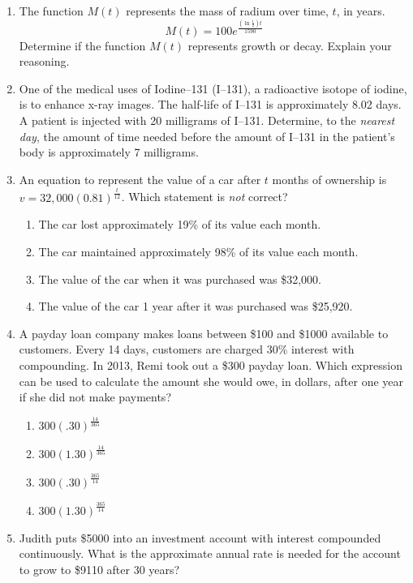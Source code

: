 \documentclass[12pt, oneside]{article}
\begin{document}
\begin{enumerate}
\item The function $M(t)$ represents the mass of radium over time, $t$, in years.
\[M(t)=100e^{\frac{\left(\ln{\frac{1}{2}}\right)t}{1590}}
\]
Determine if the function $M(t)$ represents growth or decay. Explain your reasoning. %

\item One of the medical uses of Iodine–131 (I–131), a radioactive isotope of iodine, is to enhance x-ray images. The half-life of I–131 is approximately 8.02 days. A patient is injected with 20 milligrams of I–131. Determine, to the \emph{nearest day}, the amount of time needed before the amount of I–131 in the patient’s body is approximately 7 milligrams. %

\item An equation to represent the value of a car after $t$ months of ownership is $\displaystyle v=32,000(0.81)^{\frac{t}{12}}$. Which statement is \emph{not} correct?
\begin{enumerate}
    \item The car lost approximately 19\% of its value each month.
    \item The car maintained approximately 98\% of its value each month.
    \item The value of the car when it was purchased was \$32,000.
    \item The value of the car 1 year after it was purchased was \$25,920.
\end{enumerate} %

\item A payday loan company makes loans between \$100 and \$1000 available to customers. Every 14 days, customers are charged 30\% interest with compounding. In 2013, Remi took out a \$300 payday loan. Which expression can be used to calculate the amount she would owe, in dollars, after one year if she did not make payments?
\begin{enumerate}
    \item $\displaystyle 300(.30)^{ \frac{14}{365}}$
    \item $\displaystyle 300(1.30)^{ \frac{14}{365}}$
    \item $\displaystyle 300(.30)^{ \frac{365}{14}}$
    \item $\displaystyle 300(1.30)^{ \frac{365}{14}}$
\end{enumerate} %

\item Judith puts \$5000 into an investment account with interest compounded continuously. What is the approximate annual rate is needed for the account to grow to \$9110 after 30 years?


\end{enumerate}
\end{document}
